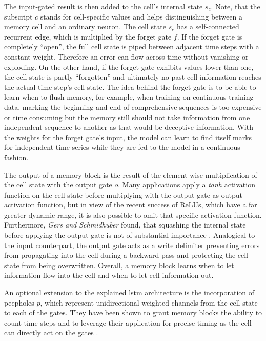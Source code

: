 The input-gated result is then added to the cell's internal state $s_c$.
Note, that the subscript $c$ stands for cell-specific values and helps distinguishing between a memory cell and an ordinary neuron.
The cell state $s_c$ has a self-connected recurrent edge, which is multiplied by the forget gate $f$.
If the forget gate is completely ``open'', the full cell state is piped between adjacent time steps with a constant weight.
Therefore an error can flow across time without vanishing or exploding.
On the other hand, if the forget gate exhibits values lower than one, the cell state is partly ``forgotten'' and ultimately no past cell information reaches the actual time step's cell state.
The idea behind the forget gate is to be able to learn when to flush memory, for example, when training on continuous training data, marking the beginning and end of comprehensive sequences is too expensive or time consuming but the memory still should not take information from one independent sequence to another as that would be deceptive information.
With the weights for the forget gate's input, the model can learn to find itself marks for independent time series while they are fed to the model in a continuous fashion.

The output of a memory block is the result of the element-wise multiplication of the cell state with the output gate $o$.
Many applications apply a \textit{tanh} activation function on the cell state before multiplying with the output gate as output activation function, but in view of the recent success of ReLUs, which have a far greater dynamic range, it is also possible to omit that specific activation function.
Furthermore, \textit{Gers and Schmidhuber} found, that squashing the internal state before applying the output gate is not of substantial importance \cite{GeSch2000}.
Analogical to the input counterpart, the output gate acts as a write delimiter preventing errors from propagating into the cell during a backward pass and protecting the cell state from being overwritten.
Overall, a memory block learns when to let information flow into the cell and when to let cell information out.

An optional extension to the explained \gls{lstm} architecture is the incorporation of peepholes $p$, which represent unidirectional weighted channels from the cell state to each of the gates.
They have been shown to grant memory blocks the ability to count time steps and to leverage their application for precise timing as the cell can directly act on the gates \cite{GeSch2000}.

